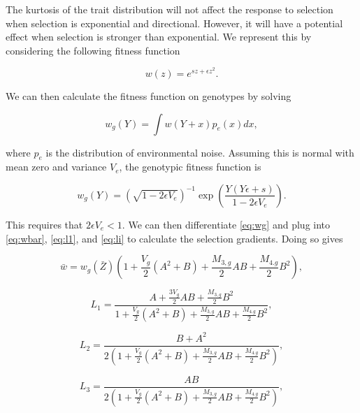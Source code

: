 The kurtosis of the trait distribution will not affect the response to selection
when selection is exponential and directional. However, it will have a potential
effect when selection is stronger than exponential. We represent this by
considering the following fitness function

\begin{equation}
  \label{eq:gexpsel}
  w(z) = e^{sz + \epsilon z^2}.
\end{equation}

We can then calculate the fitness function on genotypes by solving

\begin{equation*}
  w_g(Y) = \int w(Y + x)p_e(x)dx,
\end{equation*}

where $p_e$ is the distribution of environmental noise. Assuming this is normal
with mean zero and variance $V_e$, the genotypic fitness function is

\begin{equation}
  \label{eq:wg}
  w_g(Y) = \left( \sqrt{1-2\epsilon V_e} \right)^{-1}
  \exp\left( \frac{Y(Y\epsilon + s)}{1-2\epsilon V_e}\right).
\end{equation}

This requires that $2\epsilon V_e < 1$. We can then differentiate \eqref{eq:wg}
and plug into \eqref{eq:wbar}, \eqref{eq:l1}, and \eqref{eq:li} to calculate the
selection gradients. Doing so gives

\begin{equation}
  \bar{w} = w_g(\bar{Z})\left( 1 + \frac{V_g}{2}\left( A^2 + B \right) +
  \frac{M_{3,g}}{2}AB + \frac{M_{4.g}}{2}B^2\right),
\end{equation}

\begin{equation}
  L_1 = \frac{A + \frac{3V_g}{2}AB + \frac{M_{3,g}}{2}B^2}{1 + \frac{V_g}{2}\left( A^2 + B \right) +
  \frac{M_{3,g}}{2}AB + \frac{M_{4.g}}{2}B^2},
\end{equation}

\begin{equation}
  L_2 = \frac{B+A^2}{2\left( 1 + \frac{V_g}{2}\left( A^2 + B \right) +
  \frac{M_{3,g}}{2}AB + \frac{M_{4.g}}{2}B^2\right)},
\end{equation}

\begin{equation}
  L_3 = \frac{AB}{2\left( 1 + \frac{V_g}{2}\left( A^2 + B \right) +
  \frac{M_{3,g}}{2}AB + \frac{M_{4.g}}{2}B^2\right)},
\end{equation}

